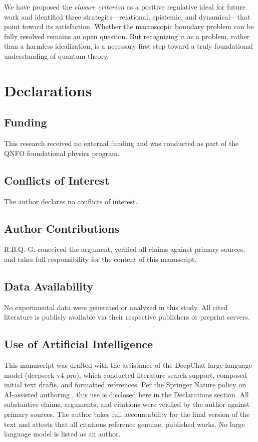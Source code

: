 \documentclass[12pt,a4paper,twoside]{article}
\begin{document}
We have proposed the \emph{closure criterion} as a positive regulative ideal for future work and identified three strategies---relational, epistemic, and dynamical---that point toward its satisfaction. Whether the macroscopic boundary problem can be fully resolved remains an open question. But recognizing it as a problem, rather than a harmless idealization, is a necessary first step toward a truly foundational understanding of quantum theory.

\section*{Declarations}

\subsection*{Funding}
This research received no external funding and was conducted as part of the QNFO foundational physics program.

\subsection*{Conflicts of Interest}
The author declares no conflicts of interest.

\subsection*{Author Contributions}
R.B.Q.-G. conceived the argument, verified all claims against primary sources, and takes full responsibility for the content of this manuscript.

\subsection*{Data Availability}
No experimental data were generated or analyzed in this study. All cited literature is publicly available via their respective publishers or preprint servers.

\subsection*{Use of Artificial Intelligence}
This manuscript was drafted with the assistance of the DeepChat large language model (deepseek-v4-pro), which conducted literature search support, composed initial text drafts, and formatted references. Per the Springer Nature policy on AI-assisted authoring \cite{SpringerAI2024}, this use is disclosed here in the Declarations section. All substantive claims, arguments, and citations were verified by the author against primary sources. The author takes full accountability for the final version of the text and attests that all citations reference genuine, published works. No large language model is listed as an author.


\end{document}
